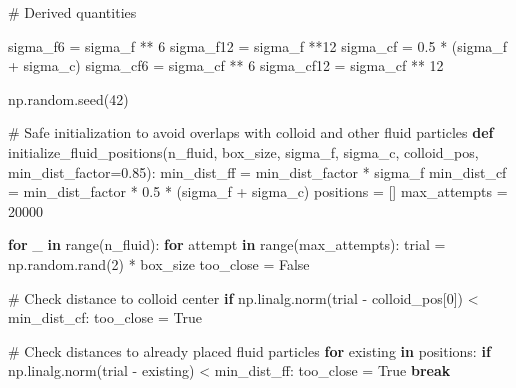\documentclass[
  letterpaper,
  enabledeprecatedfontcommands]{report}
\newenvironment{Shaded}{\begin{snugshade}}{\end{snugshade}}
\newcommand{\BuiltInTok}[1]{\textcolor[rgb]{0.00,0.23,0.31}{#1}}
\newcommand{\CommentTok}[1]{\textcolor[rgb]{0.37,0.37,0.37}{#1}}
\newcommand{\ControlFlowTok}[1]{\textcolor[rgb]{0.00,0.23,0.31}{\textbf{#1}}}
\newcommand{\DecValTok}[1]{\textcolor[rgb]{0.68,0.00,0.00}{#1}}
\newcommand{\FloatTok}[1]{\textcolor[rgb]{0.68,0.00,0.00}{#1}}
\newcommand{\KeywordTok}[1]{\textcolor[rgb]{0.00,0.23,0.31}{\textbf{#1}}}
\newcommand{\NormalTok}[1]{\textcolor[rgb]{0.00,0.23,0.31}{#1}}
\newcommand{\OperatorTok}[1]{\textcolor[rgb]{0.37,0.37,0.37}{#1}}
\newcommand{\VariableTok}[1]{\textcolor[rgb]{0.07,0.07,0.07}{#1}}
\begin{document}
\begin{Shaded}
\begin{Highlighting}[]
 \CommentTok{\# Derived quantities}

\NormalTok{sigma\_f6 }\OperatorTok{=}\NormalTok{ sigma\_f }\OperatorTok{**} \DecValTok{6}
\NormalTok{sigma\_f12 }\OperatorTok{=}\NormalTok{ sigma\_f }\OperatorTok{**}\DecValTok{12}
\NormalTok{sigma\_cf }\OperatorTok{=} \FloatTok{0.5} \OperatorTok{*}\NormalTok{ (sigma\_f }\OperatorTok{+}\NormalTok{ sigma\_c)}
\NormalTok{sigma\_cf6 }\OperatorTok{=}\NormalTok{ sigma\_cf }\OperatorTok{**} \DecValTok{6}
\NormalTok{sigma\_cf12 }\OperatorTok{=}\NormalTok{ sigma\_cf }\OperatorTok{**} \DecValTok{12}

\NormalTok{np.random.seed(}\DecValTok{42}\NormalTok{)}

\CommentTok{\# Safe initialization to avoid overlaps with colloid and other fluid particles}
\KeywordTok{def}\NormalTok{ initialize\_fluid\_positions(n\_fluid, box\_size, sigma\_f, sigma\_c, colloid\_pos, min\_dist\_factor}\OperatorTok{=}\FloatTok{0.85}\NormalTok{):}
\NormalTok{    min\_dist\_ff }\OperatorTok{=}\NormalTok{ min\_dist\_factor }\OperatorTok{*}\NormalTok{ sigma\_f}
\NormalTok{    min\_dist\_cf }\OperatorTok{=}\NormalTok{ min\_dist\_factor }\OperatorTok{*} \FloatTok{0.5} \OperatorTok{*}\NormalTok{ (sigma\_f }\OperatorTok{+}\NormalTok{ sigma\_c)}
\NormalTok{    positions }\OperatorTok{=}\NormalTok{ []}
\NormalTok{    max\_attempts }\OperatorTok{=} \DecValTok{20000}

    \ControlFlowTok{for}\NormalTok{ \_ }\KeywordTok{in} \BuiltInTok{range}\NormalTok{(n\_fluid):}
        \ControlFlowTok{for}\NormalTok{ attempt }\KeywordTok{in} \BuiltInTok{range}\NormalTok{(max\_attempts):}
\NormalTok{            trial }\OperatorTok{=}\NormalTok{ np.random.rand(}\DecValTok{2}\NormalTok{) }\OperatorTok{*}\NormalTok{ box\_size}
\NormalTok{            too\_close }\OperatorTok{=} \VariableTok{False}

            \CommentTok{\# Check distance to colloid center}
            \ControlFlowTok{if}\NormalTok{ np.linalg.norm(trial }\OperatorTok{{-}}\NormalTok{ colloid\_pos[}\DecValTok{0}\NormalTok{]) }\OperatorTok{\textless{}}\NormalTok{ min\_dist\_cf:}
\NormalTok{                too\_close }\OperatorTok{=} \VariableTok{True}

            \CommentTok{\# Check distances to already placed fluid particles}
            \ControlFlowTok{for}\NormalTok{ existing }\KeywordTok{in}\NormalTok{ positions:}
                \ControlFlowTok{if}\NormalTok{ np.linalg.norm(trial }\OperatorTok{{-}}\NormalTok{ existing) }\OperatorTok{\textless{}}\NormalTok{ min\_dist\_ff:}
\NormalTok{                    too\_close }\OperatorTok{=} \VariableTok{True}
                    \ControlFlowTok{break}


\end{Highlighting}
\end{Shaded}
\end{document}

